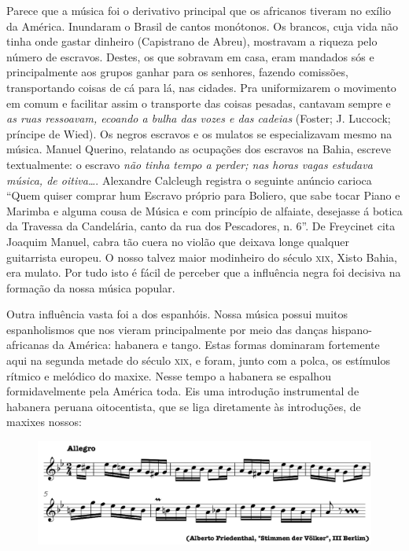 Parece que a música foi o derivativo principal que os africanos tiveram
no exílio da América. Inundaram o Brasil de cantos monótonos. Os
brancos, cuja vida não tinha onde gastar dinheiro (Capistrano de Abreu),
mostravam a riqueza pelo número de escravos. Destes, os que sobravam em
casa, eram mandados sós e principalmente aos grupos ganhar para os
senhores, fazendo comissões, transportando coisas de cá para lá, nas
cidades. Pra uniformizarem o movimento em comum e facilitar assim o
transporte das coisas pesadas, cantavam sempre e \textit{as ruas ressoavam,
ecoando a bulha das vozes e das cadeias} (Foster; J. Luccock; príncipe
de Wied). Os negros escravos e os mulatos se especializavam mesmo na
música. Manuel Querino, relatando as ocupações dos escravos na Bahia,
escreve textualmente: o escravo \textit{não tinha tempo a perder; nas horas
vagas estudava música, de oitiva\ldots{}}. Alexandre Calcleugh registra o
seguinte anúncio carioca ``Quem quiser comprar hum Escravo próprio para
Boliero, que sabe tocar Piano e Marimba e alguma cousa de Música e com
princípio de alfaiate, desejasse á botica da Travessa da Candelária,
canto da rua dos Pescadores, n. 6''. De Freycinet cita Joaquim Manuel,
cabra tão cuera no violão que deixava longe qualquer guitarrista
europeu. O nosso talvez maior modinheiro do século \textsc{xix}, Xisto Bahia, era
mulato. Por tudo isto é fácil de perceber que a influência negra foi
decisiva na formação da nossa música popular.

Outra influência vasta foi a dos espanhóis. Nossa música possui muitos
espanholismos que nos vieram principalmente por meio das danças
hispano-africanas da América: habanera e tango. Estas formas dominaram
fortemente aqui na segunda metade do século \textsc{xix}, e foram, junto com a
polca, os estímulos rítmico e melódico do maxixe. Nesse tempo a habanera
se espalhou formidavelmente pela América toda. Eis uma introdução
instrumental de habanera peruana oitocentista, que se liga diretamente
às introduções, de maxixes nossos:

 \begin{figure}[H]
 \includegraphics[width=\textwidth]{./imgs/fig4.pdf}
 \end{figure}

